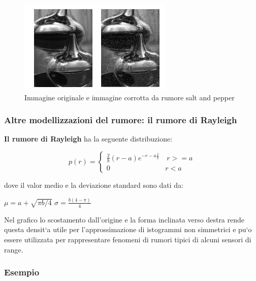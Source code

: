 \begin{figure}[H]
    \centering
    \includegraphics[width=\linewidth, keepaspectratio]{capitoli/immagini/imgs/esempio-salt-pepper.png}
    \caption*{Immagine originale e immagine corrotta da rumore salt and pepper}
\end{figure}

\subsubsection{Altre modellizzazioni del rumore: il rumore di Rayleigh}
\textbf{Il rumore di Rayleigh} ha la seguente distribuzione:


\begin{center}
    $$
        p(r) = \left\{ \begin{array}{cl}
            \frac{2}{b}(r-a)e^{-{r-a}\frac{2}{b}} & \ r >= a \\
            0                                     & r<a
        \end{array} \right.
    $$
\end{center}

dove il valor medio e la deviazione standard sono dati da:

\begin{center}
    $\mu = a + \sqrt{\pi b/4}$ $\sigma = \frac{b(4-\pi)}{4}$
\end{center}

Nel grafico lo scostamento dall’origine e la forma inclinata verso
destra rende questa densit`a utile per l’approssimazione di
istogrammi non simmetrici e pu`o essere utilizzata per rappresentare
fenomeni di rumori tipici di alcuni sensori di range.

\subsubsection{Esempio}

